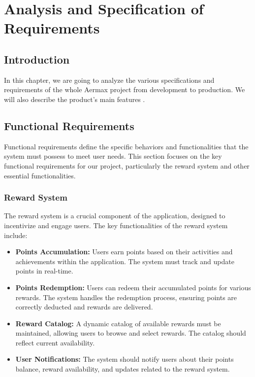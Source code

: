 \chapter{Analysis and Specification of Requirements}
\minitoc
\newpage

\setcounter{secnumdepth}{0} %

\section{Introduction}
In this chapter, we are going to analyze the various specifications and requirements of the whole Aermax project from development to production.
We will also describe the product's main features .


\section{Functional Requirements}
Functional requirements define the specific behaviors and functionalities that the system must possess to meet user needs. This section focuses on the key functional requirements for our project, particularly the reward system and other essential functionalities.

\subsection{Reward System}
The reward system is a crucial component of the application, designed to incentivize and engage users. The key functionalities of the reward system include:

\begin{itemize}
    \item \textbf{Points Accumulation:} Users earn points based on their activities and achievements within the application. The system must track and update points in real-time.
    \item \textbf{Points Redemption:} Users can redeem their accumulated points for various rewards. The system handles the redemption process, ensuring points are correctly deducted and rewards are delivered.
    \item \textbf{Reward Catalog:} A dynamic catalog of available rewards must be maintained, allowing users to browse and select rewards. The catalog should reflect current availability.
    \item \textbf{User Notifications:} The system should notify users about their points balance, reward availability, and updates related to the reward system.
\end{itemize}

